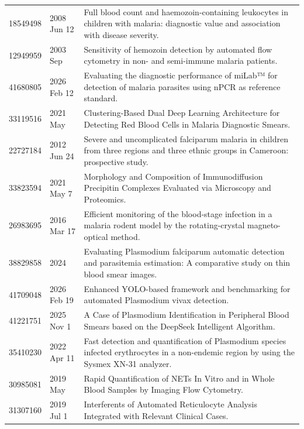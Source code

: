 \begin{longtable}{llp{9.5cm}}
18549498 & 2008 Jun 12 & Full blood count and haemozoin-containing leukocytes in children with malaria: diagnostic value and association with disease severity. \\
12949959 & 2003 Sep & Sensitivity of hemozoin detection by automated flow cytometry in non- and semi-immune malaria patients. \\
41680805 & 2026 Feb 12 & Evaluating the diagnostic performance of miLab™ for detection of malaria parasites using nPCR as reference standard. \\
33119516 & 2021 May & Clustering-Based Dual Deep Learning Architecture for Detecting Red Blood Cells in Malaria Diagnostic Smears. \\
22727184 & 2012 Jun 24 & Severe and uncomplicated falciparum malaria in children from three regions and three ethnic groups in Cameroon: prospective study. \\
33823594 & 2021 May 7 & Morphology and Composition of Immunodiffusion Precipitin Complexes Evaluated via Microscopy and Proteomics. \\
26983695 & 2016 Mar 17 & Efficient monitoring of the blood-stage infection in a malaria rodent model by the rotating-crystal magneto-optical method. \\
38829858 & 2024 & Evaluating Plasmodium falciparum automatic detection and parasitemia estimation: A comparative study on thin blood smear images. \\
41709048 & 2026 Feb 19 & Enhanced YOLO-based framework and benchmarking for automated Plasmodium vivax detection. \\
41221751 & 2025 Nov 1 & A Case of Plasmodium Identification in Peripheral Blood Smears based on the DeepSeek Intelligent Algorithm. \\
35410230 & 2022 Apr 11 & Fast detection and quantification of Plasmodium species infected erythrocytes in a non-endemic region by using the Sysmex XN-31 analyzer. \\
30985081 & 2019 May & Rapid Quantification of NETs In Vitro and in Whole Blood Samples by Imaging Flow Cytometry. \\
31307160 & 2019 Jul 1 & Interferents of Automated Reticulocyte Analysis Integrated with Relevant Clinical Cases. \\
\hline
\end{longtable}
